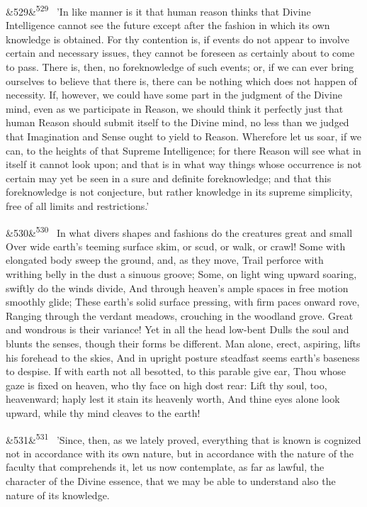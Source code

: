 \documentclass[12pt]{article}
\newcommand{\para}[1][]{\par\noindent\ifx&#1&\else\textsuperscript{\footnotesize #1}~\fi}
\begin{document}
\para[529] 'In like manner is it that human reason thinks that Divine Intelligence cannot see the future except after the fashion in which its own knowledge is obtained. For thy contention is, if events do not appear to involve certain and necessary issues, they cannot be foreseen as certainly about to come to pass. There is, then, no foreknowledge of such events; or, if we can ever bring ourselves to believe that there is, there can be nothing which does not happen of necessity. If, however, we could have some part in the judgment of the Divine mind, even as we participate in Reason, we should think it perfectly just that human Reason should submit itself to the Divine mind, no less than we judged that Imagination and Sense ought to yield to Reason. Wherefore let us soar, if we can, to the heights of that Supreme Intelligence; for there Reason will see what in itself it cannot look upon; and that is in what way things whose occurrence is not certain may yet be seen in a sure and definite foreknowledge; and that this foreknowledge is not conjecture, but rather knowledge in its supreme simplicity, free of all limits and restrictions.'

\para[530] In what divers shapes and fashions do the creatures great and small Over wide earth's teeming surface skim, or scud, or walk, or crawl! Some with elongated body sweep the ground, and, as they move, Trail perforce with writhing belly in the dust a sinuous groove; Some, on light wing upward soaring, swiftly do the winds divide, And through heaven's ample spaces in free motion smoothly glide; These earth's solid surface pressing, with firm paces onward rove, Ranging through the verdant meadows, crouching in the woodland grove. Great and wondrous is their variance! Yet in all the head low-bent Dulls the soul and blunts the senses, though their forms be different. Man alone, erect, aspiring, lifts his forehead to the skies, And in upright posture steadfast seems earth's baseness to despise. If with earth not all besotted, to this parable give ear, Thou whose gaze is fixed on heaven, who thy face on high dost rear: Lift thy soul, too, heavenward; haply lest it stain its heavenly worth, And thine eyes alone look upward, while thy mind cleaves to the earth!

\para[531] 'Since, then, as we lately proved, everything that is known is cognized not in accordance with its own nature, but in accordance with the nature of the faculty that comprehends it, let us now contemplate, as far as lawful, the character of the Divine essence, that we may be able to understand also the nature of its knowledge.
\end{document}
